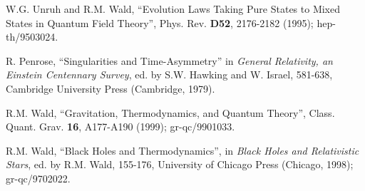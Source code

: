 \documentclass[12pt]{article}
\newcommand{\comment}[1]{}
\newcommand{\keywords}[1]{}
\begin{document}
\begin{thebibliography}{999}
\comment{article} W.G. Unruh and R.M. Wald, ``Evolution
Laws Taking Pure States to Mixed States in Quantum Field Theory'',
Phys. Rev. {\bf D52}, 2176-2182 (1995);
hep-th/9503024. \keywords{black hole thermodynamics, quantum gravity}

\comment{inbook} R. Penrose, ``Singularities and
Time-Asymmetry'' in {\it General Relativity, an Einstein Centennary
Survey}, ed. by S.W. Hawking and W. Israel, 581-638, Cambridge
University Press (Cambridge, 1979).  \keywords{black hole
thermodynamics, singularities, entropy, quantum gravity}

\comment{article} R.M. Wald, ``Gravitation,
Thermodynamics, and Quantum Theory'', Class. Quant. Grav. {\bf 16},
A177-A190 (1999); gr-qc/9901033.  \keywords{black hole thermodynamics,
entropy, quantum gravity}

\comment{inbook} R.M. Wald, ``Black Holes and
Thermodynamics'', in {\it Black Holes and Relativistic Stars}, ed. by
R.M. Wald, 155-176, University of Chicago Press (Chicago,
1998); gr-qc/9702022. \keywords{black hole thermodynamics, entropy}

\end{thebibliography}
\end{document}
